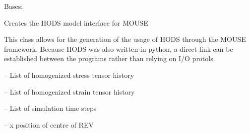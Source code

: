 \documentclass[letterpaper,10pt,english]{sphinxmanual}
\begin{document}
\begin{fulllineitems}
\label{\detokenize{MouseReferenceManual:Modules.Module_HODS.Module_HODS}}
Bases: {\hyperref[\detokenize{MouseReferenceManual:Modules.Base.HomogenizationModuleBaseClass}]{}}

Creates the HODS model interface for MOUSE

This class allows for the generation of the usage of HODS through the MOUSE framework. Because HODS was also written in python, a direct link can be established between the programs rather than relying on I/O protols.

\begin{fulllineitems}
\label{\detokenize{MouseReferenceManual:Modules.Module_HODS.Module_HODS.stressHistory}}
 -- List of homogenized stress tensor history

\end{fulllineitems}


\begin{fulllineitems}
\label{\detokenize{MouseReferenceManual:Modules.Module_HODS.Module_HODS.strainHistory}}
 -- List of homogenized strain tensor history

\end{fulllineitems}


\begin{fulllineitems}
\label{\detokenize{MouseReferenceManual:Modules.Module_HODS.Module_HODS.timeHistory}}
 -- List of simulation time steps

\end{fulllineitems}


\begin{fulllineitems}
\label{\detokenize{MouseReferenceManual:Modules.Module_HODS.Module_HODS.revCentreX}}
 -- x position of centre of REV


\end{fulllineitems}
\end{fulllineitems}
\end{document}
